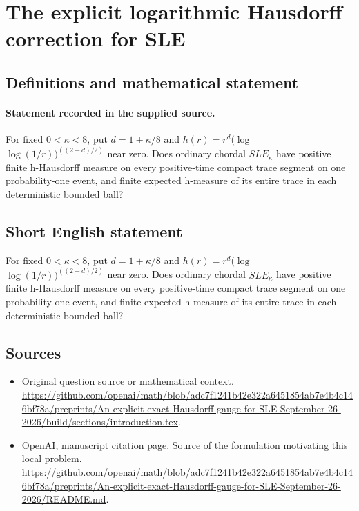 \documentclass[11pt]{article}
\begin{document}
\section*{The explicit logarithmic Hausdorff correction for SLE}\label{statement}
\subsection{Definitions and mathematical statement}
\paragraph{Statement recorded in the supplied source.}
For fixed $0<\kappa <8$, put $d=1+\kappa /8$ and $h(r)=r^d(\log $ $\log (1/r))^((2-d)/2)$ near zero. Does ordinary chordal $SLE_\kappa $ have positive finite h-Hausdorff measure on every positive-time compact trace segment on one probability-one event, and finite expected h-measure of its entire trace in each deterministic bounded ball?
\subsection{Short English statement}
For fixed $0<\kappa <8$, put $d=1+\kappa /8$ and $h(r)=r^d(\log $ $\log (1/r))^((2-d)/2)$ near zero. Does ordinary chordal $SLE_\kappa $ have positive finite h-Hausdorff measure on every positive-time compact trace segment on one probability-one event, and finite expected h-measure of its entire trace in each deterministic bounded ball?
\subsection{Sources}
\begin{itemize}
\item[S1] Original question source or mathematical context.
\url{https://github.com/openai/math/blob/adc7f1241b42e322a6451854ab7e4b4c146bf78a/preprints/An-explicit-exact-Hausdorff-gauge-for-SLE-September-26-2026/build/sections/introduction.tex}.
\item[S2] OpenAI, manuscript citation page. Source of the formulation motivating this local problem.
\url{https://github.com/openai/math/blob/adc7f1241b42e322a6451854ab7e4b4c146bf78a/preprints/An-explicit-exact-Hausdorff-gauge-for-SLE-September-26-2026/README.md}.
\end{itemize}
\end{document}
